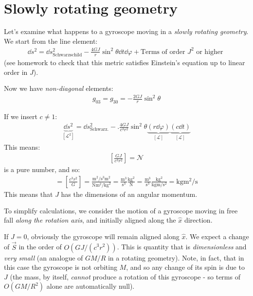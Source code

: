 \documentclass[../template.tex]{subfiles}
\begin{document}
\section{Slowly rotating geometry}
Let's examine what happens to a gyroscope moving in a \textit{slowly rotating geometry}. We start from the line element:
\begin{align*}
    \dd{s}^2 = \dd{s}^2_{\mathrm{Schwarzschild}} - \frac{4GJ}{r} \sin^2 \theta \dd{t} \dd{\varphi} + \text{Terms of order $J^2$ or higher } 
\end{align*} 
(see homework to check that this metric satisfies Einstein's equation up to linear order in $J$). 

\medskip

Now we have \textit{non-diagonal} elements:
\begin{align*}
    g_{03} = g_{30} = -\frac{2G J}{r} \sin^2 \theta 
\end{align*} 

If we insert $c \neq 1$:
\begin{align*}
    \underbrace{\dd{s}^2}_{[\mathcal{L}^2]}  = \dd{s}^2_{\mathrm{Schwarz.} } -. \frac{4GJ}{c^3 r^2}  \sin^2 \theta \underbrace{(r \dd{\varphi}) }_{[\mathcal{L}]}\underbrace{ (c\dd{t})}_{[\mathcal{L}]} 
\end{align*} 
This means:
\begin{align*}
    \left[\frac{GJ}{c^3 r^2} \right] = \mathcal{N} 
\end{align*}
is a pure number, and so:
\begin{align*}
    [J] = \left[\frac{c^3 r^2}{G} \right] = \frac{\si{\m\squared \per \s\cubed}\si{\m\squared}}{\si{\N \m\squared\per\kilo\g\squared}} = \frac{\si{\m\cubed}}{\si{\s\cubed}} \frac{\si{\kilo\g\squared}}{\si{\newton}} = \frac{\si{\m\cubed}}{\si{\s\cubed}} \frac{\si{\kilo\g\squared}}{\si{\kilo\g \m\per \s\squared}} = \si{\kilo\g \m\squared \per \s} 
\end{align*}
This means that $J$ has the dimensions of an angular momentum.  

To simplify calculations, we consider the motion of a gyroscope moving in free fall \textit{along the rotation axis}, and initially aligned along the $\hat{x}$ direction. 

If $J=0$, obviously the gyroscope will remain aligned along $\hat{x}$. We expect a change of $\vec{S}$ in the order of $O\left(GJ/(c^3 r^2)\right)$. This is quantity that is \textit{dimensionless} and \textit{very small} (an analogue of $GM/R$ in a rotating geometry). Note, in fact, that in this case the gyroscope is not orbiting $M$, and so any change of its spin is due to $J$ (the mass, by itself, \textit{cannot} produce a rotation of this gyroscope - so terms of $O(GM/R^2)$ alone are automatically null).
\end{document}
